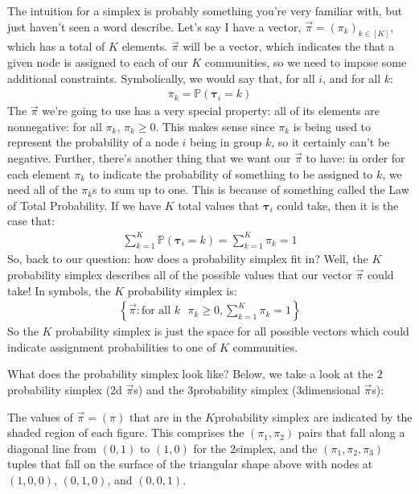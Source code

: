 \documentclass[letterpaper,10pt,english]{jupyterBook}
\begin{document}
\sphinxAtStartPar
The intuition for a simplex is probably something you’re very familiar with, but just haven’t seen a word describe. Let’s say I have a vector, \(\vec\pi = (\pi_k)_{k \in [K]}\), which has a total of \(K\) elements. \(\vec\pi\) will be a vector, which indicates the  that a given node is assigned to each of our \(K\) communities, so we need to impose some additional constraints. Symbolically, we would say that, for all \(i\), and for all \(k\):
\begin{align*}
    \pi_k = \mathbb P(\pmb\tau_i = k)
\end{align*}
\sphinxAtStartPar
The \(\vec \pi\) we’re going to use has a very special property: all of its elements are non\sphinxhyphen{}negative: for all \(\pi_k\), \(\pi_k \geq 0\). This makes sense since \(\pi_k\) is being used to represent the probability of a node \(i\) being in group \(k\), so it certainly can’t be negative. Further, there’s another thing that we want our \(\vec\pi\) to have: in order for each element \(\pi_k\) to indicate the probability of something to be assigned to \(k\), we need all of the \(\pi_k\)s to sum up to one. This is because of something called the Law of Total Probability. If we have \(K\) total values that \(\pmb \tau_i\) could take, then it is the case that:
\begin{align*}
    \sum_{k=1}^K \mathbb P(\pmb \tau_i = k) = \sum_{k = 1}^K \pi_k = 1
\end{align*}
\sphinxAtStartPar
So, back to our question: how does a probability simplex fit in? Well, the \(K\) probability simplex describes all of the possible values that our vector \(\vec\pi\) could take! In symbols, the \(K\) probability simplex is:
\begin{align*}
\left\{\vec\pi : \text{for all $k$ }\pi_k \geq 0, \sum_{k = 1}^K \pi_k = 1 \right\}
\end{align*}
\sphinxAtStartPar
So the \(K\) probability simplex is just the space for all possible vectors which could indicate assignment probabilities to one of \(K\) communities.

\sphinxAtStartPar
What does the probability simplex look like? Below, we take a look at the \(2\)\sphinxhyphen{}probability simplex (2\sphinxhyphen{}d \(\vec\pi\)s) and the \(3\)\sphinxhyphen{}probability simplex (3\sphinxhyphen{}dimensional \(\vec\pi\)s):

\noindent{}

\sphinxAtStartPar
The values of \(\vec\pi = (\pi)\) that are in the \(K\)\sphinxhyphen{}probability simplex are indicated by the shaded region of each figure. This comprises the \((\pi_1, \pi_2)\) pairs that fall along a diagonal line from \((0,1)\) to \((1,0)\) for the \(2\)\sphinxhyphen{}simplex, and the \((\pi_1, \pi_2, \pi_3)\) tuples that fall on the surface of the triangular shape above with nodes at \((1,0,0)\), \((0,1,0)\), and \((0,0,1)\).
\end{document}
